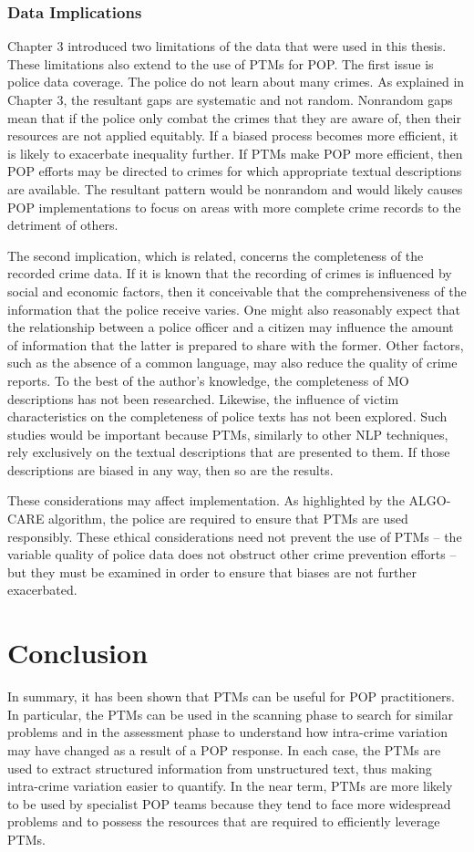 \subsubsection{Data Implications} Chapter 3 introduced two limitations of the data that were used in this thesis. These limitations also extend to the use of PTMs for POP. The first issue is police data coverage. The police do not learn about many crimes. As explained in Chapter 3, the resultant gaps are systematic and not random. Nonrandom gaps mean that if the police only combat the crimes that they are aware of, then their resources are not applied equitably. If a biased process becomes more efficient, it is likely to exacerbate inequality further. If PTMs make POP more efficient, then POP efforts may be directed to crimes for which appropriate textual descriptions are available. The resultant pattern would be nonrandom and would likely causes POP implementations to focus on areas with more complete crime records to the detriment of others.

The second implication, which is related, concerns the completeness of the recorded crime data. If it is known that the recording of crimes is influenced by social and economic factors, then it conceivable that the comprehensiveness of the information that the police receive varies. One might also reasonably expect that the relationship between a police officer and a citizen may influence the amount of information that the latter is prepared to share with the former. Other factors, such as the absence of a common language, may also reduce the quality of crime reports. To the best of the author’s knowledge, the completeness of MO descriptions has not been researched. Likewise, the influence of victim characteristics on the completeness of police texts has not been explored. Such studies would be important because PTMs, similarly to other NLP techniques, rely exclusively on the textual descriptions that are presented to them. If those descriptions are biased in any way, then so are the results.

These considerations may affect implementation. As highlighted by the ALGO-CARE algorithm, the police are required to ensure that PTMs are used responsibly. These ethical considerations need not prevent the use of PTMs – the variable quality of police data does not obstruct other crime prevention efforts – but they must be examined in order to ensure that biases are not further exacerbated.

\section{Conclusion} In summary, it has been shown that PTMs can be useful for POP practitioners. In particular, the PTMs can be used in the scanning phase to search for similar problems and in the assessment phase to understand how intra-crime variation may have changed as a result of a POP response. In each case, the PTMs are used to extract structured information from unstructured text, thus making intra-crime variation easier to quantify. In the near term, PTMs are more likely to be used by specialist POP teams because they tend to face more widespread problems and to possess the resources that are required to efficiently leverage PTMs.


